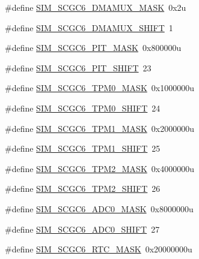 \begin{DoxyCompactItemize}
\item 
\#define \hyperlink{group___s_i_m___register___masks_ga10469a89e2c48cd79e29fb73b0d06395}{S\+I\+M\+\_\+\+S\+C\+G\+C6\+\_\+\+D\+M\+A\+M\+U\+X\+\_\+\+M\+A\+SK}~0x2u
\item 
\#define \hyperlink{group___s_i_m___register___masks_gaa69ac431213fb94ecd1d9ed2fa966e50}{S\+I\+M\+\_\+\+S\+C\+G\+C6\+\_\+\+D\+M\+A\+M\+U\+X\+\_\+\+S\+H\+I\+FT}~1
\item 
\#define \hyperlink{group___s_i_m___register___masks_gaf5baabd241aba695593ce6369aa56ee2}{S\+I\+M\+\_\+\+S\+C\+G\+C6\+\_\+\+P\+I\+T\+\_\+\+M\+A\+SK}~0x800000u
\item 
\#define \hyperlink{group___s_i_m___register___masks_ga2600ceb860eb353aa61abbecdbf5b6ae}{S\+I\+M\+\_\+\+S\+C\+G\+C6\+\_\+\+P\+I\+T\+\_\+\+S\+H\+I\+FT}~23
\item 
\#define \hyperlink{group___s_i_m___register___masks_gad879476f2922fd7dad2f65d3d052e95d}{S\+I\+M\+\_\+\+S\+C\+G\+C6\+\_\+\+T\+P\+M0\+\_\+\+M\+A\+SK}~0x1000000u
\item 
\#define \hyperlink{group___s_i_m___register___masks_ga9e379c439a6d1d14f65b4c58c46453c5}{S\+I\+M\+\_\+\+S\+C\+G\+C6\+\_\+\+T\+P\+M0\+\_\+\+S\+H\+I\+FT}~24
\item 
\#define \hyperlink{group___s_i_m___register___masks_ga94a77c9065fd06f267b9920024067cd6}{S\+I\+M\+\_\+\+S\+C\+G\+C6\+\_\+\+T\+P\+M1\+\_\+\+M\+A\+SK}~0x2000000u
\item 
\#define \hyperlink{group___s_i_m___register___masks_ga26bf0c38385affd6680bb0f4853e43df}{S\+I\+M\+\_\+\+S\+C\+G\+C6\+\_\+\+T\+P\+M1\+\_\+\+S\+H\+I\+FT}~25
\item 
\#define \hyperlink{group___s_i_m___register___masks_ga6e18a8c1e42f318d03294d14df255132}{S\+I\+M\+\_\+\+S\+C\+G\+C6\+\_\+\+T\+P\+M2\+\_\+\+M\+A\+SK}~0x4000000u
\item 
\#define \hyperlink{group___s_i_m___register___masks_gafc1cb84a2b2b306b043c31ed98213ff0}{S\+I\+M\+\_\+\+S\+C\+G\+C6\+\_\+\+T\+P\+M2\+\_\+\+S\+H\+I\+FT}~26
\item 
\#define \hyperlink{group___s_i_m___register___masks_ga481c725e02da6a245c9d715307969f09}{S\+I\+M\+\_\+\+S\+C\+G\+C6\+\_\+\+A\+D\+C0\+\_\+\+M\+A\+SK}~0x8000000u
\item 
\#define \hyperlink{group___s_i_m___register___masks_ga3f62de5fc5ccaa13d6975cf1e0ebba03}{S\+I\+M\+\_\+\+S\+C\+G\+C6\+\_\+\+A\+D\+C0\+\_\+\+S\+H\+I\+FT}~27
\item 
\#define \hyperlink{group___s_i_m___register___masks_gad51b16006c9f793c4b342ea1ff91a846}{S\+I\+M\+\_\+\+S\+C\+G\+C6\+\_\+\+R\+T\+C\+\_\+\+M\+A\+SK}~0x20000000u

\end{DoxyCompactItemize}
